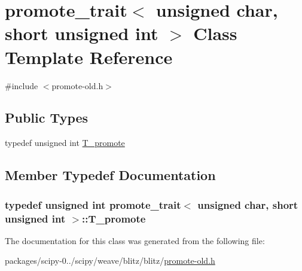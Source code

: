 \hypertarget{classpromote__trait_3_01unsigned_01char_00_01short_01unsigned_01int_01_4}{}\section{promote\+\_\+trait$<$ unsigned char, short unsigned int $>$ Class Template Reference}
\label{classpromote__trait_3_01unsigned_01char_00_01short_01unsigned_01int_01_4}


{\ttfamily \#include $<$promote-\/old.\+h$>$}

\subsection*{Public Types}
\begin{DoxyCompactItemize}
\item 
typedef unsigned int \hyperlink{classpromote__trait_3_01unsigned_01char_00_01short_01unsigned_01int_01_4_a3af2c8426ce6f9d3c51345af8db06e85}{T\+\_\+promote}
\end{DoxyCompactItemize}


\subsection{Member Typedef Documentation}
\hypertarget{classpromote__trait_3_01unsigned_01char_00_01short_01unsigned_01int_01_4_a3af2c8426ce6f9d3c51345af8db06e85}{}
\subsubsection[{T\+\_\+promote}]{\setlength{\rightskip}{0pt plus 5cm}typedef unsigned int {\bf promote\+\_\+trait}$<$ unsigned char, short unsigned int $>$\+::{\bf T\+\_\+promote}}\label{classpromote__trait_3_01unsigned_01char_00_01short_01unsigned_01int_01_4_a3af2c8426ce6f9d3c51345af8db06e85}


The documentation for this class was generated from the following file\+:\begin{DoxyCompactItemize}
\item 
packages/scipy-\/0../scipy/weave/blitz/blitz/\hyperlink{promote-old_8h}{promote-\/old.\+h}\end{DoxyCompactItemize}
